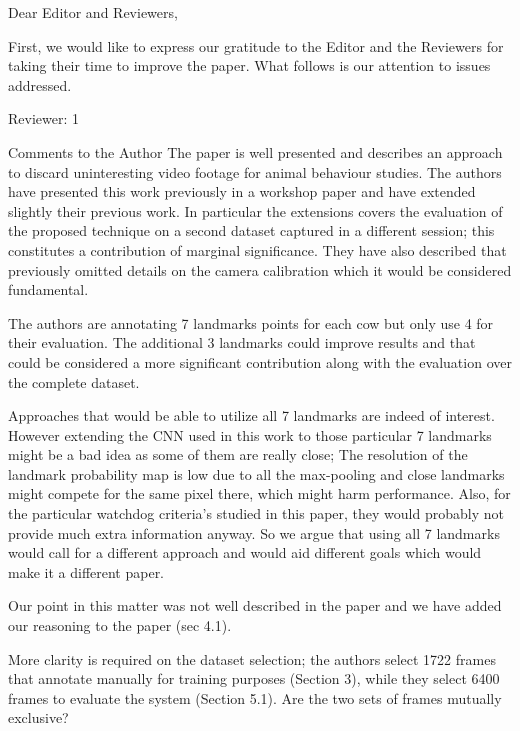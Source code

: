 \documentclass[10pt,a4paper]{letter}
\begin{document}
 
\begin{letter}{} 
\opening{Dear Editor and Reviewers,} 
 
First, we would like to express our gratitude to the Editor and the Reviewers for taking their time to
improve the paper. What follows is our attention to issues addressed.


\begin{siderules}
Reviewer: 1

Comments to the Author
The paper is well presented and describes an approach to discard uninteresting video footage for animal behaviour studies. 
The authors have presented this work previously in a workshop paper and have extended slightly their previous work. 
In particular the extensions covers the evaluation of the proposed technique on a second dataset captured in a different session; 
this constitutes a contribution of marginal significance. 
They have also described that previously omitted details on the camera calibration which it would be considered fundamental.

The authors are annotating 7 landmarks points for each cow but only use 4 for their evaluation. The additional 3 landmarks could improve 
results and that could be considered a more significant contribution along with the evaluation over the complete dataset.
\end{siderules}

Approaches that would be able to utilize all 7 landmarks are indeed of interest. However extending the CNN
used in this work to those particular 7 landmarks might be a bad idea as some of them are really close; The resolution of the landmark probability map is low due
to all the max-pooling and close landmarks might compete for the same pixel there, which might harm performance. 
Also, for the particular watchdog criteria's 
studied in this paper, they would probably not provide much extra information anyway. So we argue that using all 7 landmarks 
would call for a different approach and would aid different goals which would make it a different paper.

Our point in this matter was not well described in the paper and we have added our reasoning to the paper (sec 4.1).

\begin{siderules}
More clarity is required on the dataset selection; the authors select 1722 frames that annotate manually for training purposes (Section 3), 
while they select 6400 frames to evaluate the system (Section 5.1). Are the two sets of frames mutually exclusive?
\end{siderules}


\end{letter}
\end{document}
